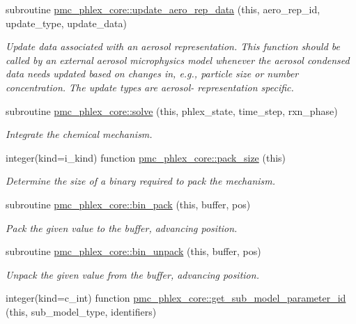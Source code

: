 \begin{DoxyCompactItemize}
subroutine \mbox{\hyperlink{namespacepmc__phlex__core_a92ef5a71ae9f1520013e20dafd557b9c}{pmc\+\_\+phlex\+\_\+core\+::update\+\_\+aero\+\_\+rep\+\_\+data}} (this, aero\+\_\+rep\+\_\+id, update\+\_\+type, update\+\_\+data)
\begin{DoxyCompactList}\small\item\em Update data associated with an aerosol representation. This function should be called by an external aerosol microphysics model whenever the aerosol condensed data needs updated based on changes in, e.\+g., particle size or number concentration. The update types are aerosol-\/ representation specific. \end{DoxyCompactList}\item 
subroutine \mbox{\hyperlink{namespacepmc__phlex__core_ad11997713c2b007cafdbe7aa2b4a8c6a}{pmc\+\_\+phlex\+\_\+core\+::solve}} (this, phlex\+\_\+state, time\+\_\+step, rxn\+\_\+phase)
\begin{DoxyCompactList}\small\item\em Integrate the chemical mechanism. \end{DoxyCompactList}\item 
integer(kind=i\+\_\+kind) function \mbox{\hyperlink{namespacepmc__phlex__core_acc35bccfc7c3e9afcac4c02ef70603c4}{pmc\+\_\+phlex\+\_\+core\+::pack\+\_\+size}} (this)
\begin{DoxyCompactList}\small\item\em Determine the size of a binary required to pack the mechanism. \end{DoxyCompactList}\item 
subroutine \mbox{\hyperlink{namespacepmc__phlex__core_a29957c901f68f6bb3da3eaa74a5aa482}{pmc\+\_\+phlex\+\_\+core\+::bin\+\_\+pack}} (this, buffer, pos)
\begin{DoxyCompactList}\small\item\em Pack the given value to the buffer, advancing position. \end{DoxyCompactList}\item 
subroutine \mbox{\hyperlink{namespacepmc__phlex__core_ac90388c65594512e1a8cbbbd5846ac65}{pmc\+\_\+phlex\+\_\+core\+::bin\+\_\+unpack}} (this, buffer, pos)
\begin{DoxyCompactList}\small\item\em Unpack the given value from the buffer, advancing position. \end{DoxyCompactList}\item 
integer(kind=c\+\_\+int) function \mbox{\hyperlink{namespacepmc__phlex__core_a3af28e9bd752be969deb76bed87ca603}{pmc\+\_\+phlex\+\_\+core\+::get\+\_\+sub\+\_\+model\+\_\+parameter\+\_\+id}} (this, sub\+\_\+model\+\_\+type, identifiers)

\end{DoxyCompactItemize}
